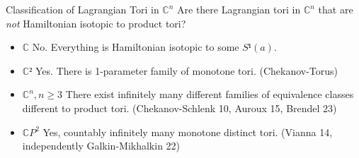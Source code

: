 \documentclass[aspectratio=169]{beamer}
\begin{document}
\begin{frame}{Classification of Lagrangian Tori in $ℂ^n$}
  Are there Lagrangian tori in $ℂ^n$ that are \emph{not} Hamiltonian isotopic to product tori?

  \begin{itemize}
    \item<2-> $ℂ$ No. Everything is Hamiltonian isotopic to some $S¹(a)$.
    
    \item<3-> $ℂ²$ Yes. There is 1-parameter family of monotone tori. (Chekanov-Torus)
    
    \item<4-> $ℂ^n, n ≥ 3$ There exist infinitely many different families of equivalence classes different to product tori. (Chekanov-Schlenk 10, Auroux 15, Brendel 23)
    
    \item<5-> $ℂP^2$ Yes, countably infinitely many monotone distinct tori. (Vianna 14, independently Galkin-Mikhalkin 22)
  \end{itemize}
\end{frame}
\end{document}
